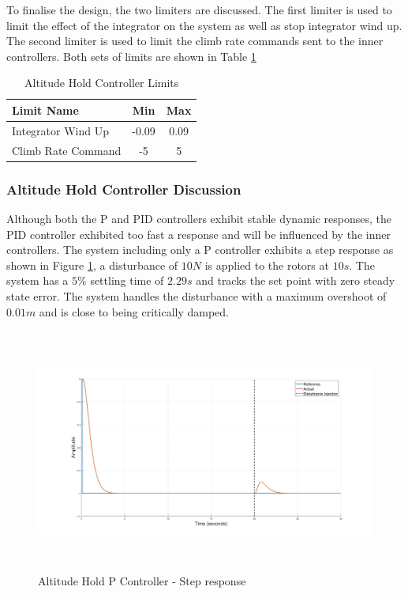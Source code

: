 \documentclass[12pt]{report}
\begin{document}
To finalise the design, the two limiters are discussed. The first limiter is used to limit the effect of the integrator on the system as well as stop integrator wind up. The second limiter is used to limit the climb rate commands sent to the inner controllers. Both sets of limits are shown in Table \ref{tab:AltitudeControllerLimits}

\begin{table}[!]
	\centering
	\begin{tabular}{l | c | c |}
		Limit Name 						& Min & Max\\
		\hline\hline
		Integrator Wind Up 				& -0.09 & 0.09 \\
		Climb Rate Command 		    	& -5 & 5 \\
	\end{tabular}
	\caption{Altitude Hold Controller Limits}
	\label{tab:AltitudeControllerLimits}
\end{table}

\subsubsection{Altitude Hold Controller Discussion}
Although both the P and PID controllers exhibit stable dynamic responses, the PID controller exhibited too fast a response and will be influenced by the inner controllers. The system including only a P controller exhibits a step response as shown in Figure \ref{IM_AltHoldStep}, a disturbance of $10N$ is applied to the rotors at $10s$. The system has a $5\%$ settling time of $2.29s$ and tracks the set point with zero steady state error. The system handles the disturbance with a maximum overshoot of $0.01m$ and is close to being critically damped.

\begin{figure}[H]
	\centering
	\includegraphics[height = 8cm]{../Design/Matlab/Controllers/altitude_step_p_no_dist.jpg}
	\caption{Altitude Hold P Controller -  Step response}
	\label{IM_AltHoldStep}
\end{figure}
\end{document}
